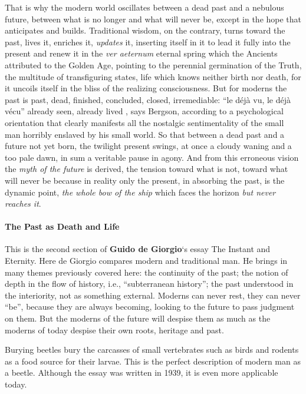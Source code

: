 That is why the modern world oscillates between a dead past and a nebulous future, between what is no longer and what will never be, except in the hope that anticipates and builds. Traditional wisdom, on the contrary, turns toward the past, lives it, enriches it, \emph{updates} it, inserting itself in it to lead it fully into the present and renew it in the \emph{ver aeternum} eternal spring which the Ancients attributed to the Golden Age, pointing to the perennial germination of the Truth, the multitude of transfiguring states, life which knows neither birth nor death, for it uncoils itself in the bliss of the realizing consciousness. But for moderns the past is past, dead, finished, concluded, closed, irremediable: ``le déjà vu, le déjà vécu'' already seen, already lived , says Bergson, according to a psychological orientation that clearly manifests all the nostalgic sentimentality of the small man horribly enslaved by his small world. So that between a dead past and a future not yet born, the twilight present swings, at once a cloudy waning and a too pale dawn, in sum a veritable pause in agony. And from this erroneous vision the \emph{myth of the future} is derived, the tension toward what is not, toward what will never be because in reality only the present, in absorbing the past, is the dynamic point, \emph{the whole bow of the ship} which faces the horizon \emph{but never reaches it}.


\paragraph{The Past as Death and Life}

\begin{quotationx}
This is the second section of \textbf{Guido de Giorgio}`s essay The Instant and Eternity. Here de Giorgio compares modern and traditional man. He brings in many themes previously covered here: the continuity of the past; the notion of depth in the flow of history, i.e., ``subterranean history''; the past understood in the interiority, not as something external. Moderns can never rest, they can never ``be'', because they are always becoming, looking to the future to pass judgment on them. But the moderns of the future will despise them as much as the moderns of today despise their own roots, heritage and past.

Burying beetles bury the carcasses of small vertebrates such as birds and rodents as a food source for their larvae. This is the perfect description of modern man as a beetle. Although the essay was written in 1939, it is even more applicable today.
\end{quotationx}


